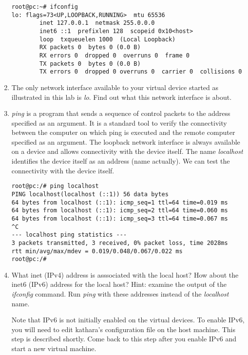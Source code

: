 \documentclass[12pt]{book}
\begin{document}
\begin{enumerate}[{Activity }1)]
\begin{verbatim}
root@pc:~# ifconfig
lo: flags=73<UP,LOOPBACK,RUNNING>  mtu 65536
        inet 127.0.0.1  netmask 255.0.0.0
        inet6 ::1  prefixlen 128  scopeid 0x10<host>
        loop  txqueuelen 1000  (Local Loopback)
        RX packets 0  bytes 0 (0.0 B)
        RX errors 0  dropped 0  overruns 0  frame 0
        TX packets 0  bytes 0 (0.0 B)
        TX errors 0  dropped 0 overruns 0  carrier 0  collisions 0
\end{verbatim}

\item The only network interface available to your virtual device started as illustrated in this lab is \emph{lo}. Find out what this network interface is about.

\item \emph{ping} is a program that sends a sequence of control packets to the address specified as an argument. It is a standard tool to verify the connectivity between the computer on which ping is executed and the remote computer specified as an argument. The loopback network interface is always available on a device and allows connectivity with the device itself. The name \emph{localhost} identifies the device itself as an address (name actually). We can test the connectivity with the device itself.

\begin{verbatim}
root@pc:/# ping localhost
PING localhost(localhost (::1)) 56 data bytes
64 bytes from localhost (::1): icmp_seq=1 ttl=64 time=0.019 ms
64 bytes from localhost (::1): icmp_seq=2 ttl=64 time=0.060 ms
64 bytes from localhost (::1): icmp_seq=3 ttl=64 time=0.067 ms
^C
--- localhost ping statistics ---
3 packets transmitted, 3 received, 0% packet loss, time 2028ms
rtt min/avg/max/mdev = 0.019/0.048/0.067/0.022 ms
root@pc:/# 
\end{verbatim}

\item What inet (IPv4) address is asssociated with the local host? How about the inet6 (IPv6) address for the local host? Hint: examine the output of the \emph{ifconfig} command. Run \emph{ping} with these addresses instead of the \emph{localhost} name.

  Note that IPv6 is not initially enabled on the virtual devices. To enable IPv6, you will need to edit kathara's configuration file on the host machine. This step is described shortly. Come back to this step after you enable IPv6 and start a new virtual machine.


\end{enumerate}
\end{document}
